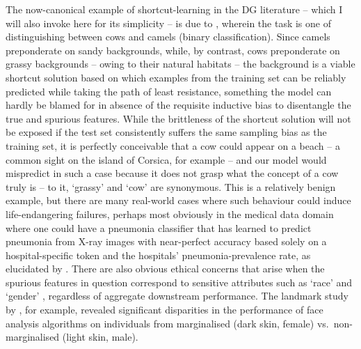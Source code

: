 %
The now-canonical example of shortcut-learning in the \ac{DG} literature -- which I will also
invoke here for its simplicity -- is due to \citet{beery2018recognition}, wherein the task is one of
distinguishing between cows and camels (binary classification). 
%
%
Since camels preponderate on sandy backgrounds, while, by contrast, cows preponderate on grassy
backgrounds -- owing to their natural habitats -- the background is a viable shortcut solution
based on which examples from the training set can be reliably predicted while taking the path of
least resistance, something the model can hardly be blamed for in absence of the requisite
inductive bias to disentangle the true and spurious features.
%
While the brittleness of the shortcut solution will not be exposed if the test set consistently
suffers the same sampling bias as the training set, it is perfectly conceivable that a cow could
appear on a beach -- a common sight on the island of Corsica, for example -- and our model would
mispredict in such a case because it does not grasp what the concept of a cow truly is -- to it,
`grassy' and `cow' are synonymous.
%
This is a relatively benign example, but there are many real-world cases where such behaviour could
induce life-endangering failures, perhaps most obviously in the medical data domain where one could
have a pneumonia classifier that has learned to predict pneumonia from X-ray images with
near-perfect accuracy based solely on a hospital-specific token and the hospitals'
pneumonia-prevalence rate, as elucidated by \citet{zech2018variable}.
%
There are also obvious ethical concerns that arise when the spurious features in question
correspond to sensitive attributes such as `race' and `gender' \citep{buolamwini2018gender,
wang2019balanced}, regardless of aggregate downstream performance. 
%
The landmark study by \citet{buolamwini2018gender}, for example, revealed significant disparities
in the performance of face analysis algorithms on individuals from marginalised (dark skin, female)
vs.\ non-marginalised (light skin, male).

